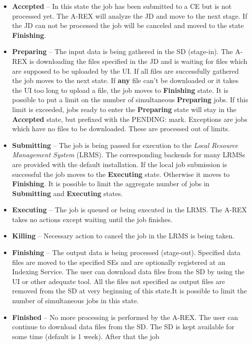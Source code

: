 \documentclass{article}                            %
\begin{document}
\begin{itemize}
\item \textbf{Accepted} -- In this state the job has been submitted to a
CE but is not processed yet. The A-REX will analyze the JD and move
to the next stage. If the JD can not be processed the job will be
canceled and moved to the state \textbf{Finishing}.
\item \textbf{Preparing} -- The input data is being gathered in the SD (stage-in).
The A-REX is downloading the files specified in the JD and is waiting
for files which are supposed to be uploaded by the UI. If all files
are successfully gathered the job moves to the next state. If \textbf{any}
file can't be downloaded or it takes the UI too long to upload a file,
the job moves to \textbf{Finishing} state. It is possible to put a
limit on the number of simultaneous \textbf{Preparing} jobs. 
If this limit is exceeded, jobs ready to enter the \textbf{Preparing} state
 will stay in the \textbf{Accepted} state, but prefixed with the PENDING:
mark. Exceptions are jobs which have no files to be downloaded. These
are processed out of limits.
\item \textbf{Submitting} -- The job is being passed for execution to the
\emph{Local Resource Management System} (LRMS). The corresponding
backends for many LRMSs are provided with the default installation.
If the local job submission is successful the job moves to the \textbf{Executing}
state. Otherwise it moves to \textbf{Finishing}. It is possible to
limit the aggregate number of jobs in \textbf{Submitting} and \textbf{Executing}
states.
\item \textbf{Executing} -- The job is queued or being executed in the LRMS.
The A-REX takes no actions except waiting until the job finishes.
\item \textbf{Killing} -- Necessary action to cancel the job in the LRMS
is being taken.
\item \textbf{Finishing} -- The output data is being processed (stage-out).
Specified data files are moved to the specified SEs and are optionally
registered at an Indexing Service. The user can download data files
from the SD by using the UI or other adequate tool. All the files
not specified as output files are removed from the SD at very beginning
of this state.It is possible to limit the number of simultaneous jobs in this state.
\item \textbf{Finished} -- No more processing is performed by the A-REX.
The user can continue to download data files from the SD. The SD is
kept available for some time (default is 1 week). After that the job

\end{itemize}
\end{document}
